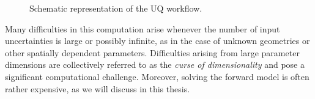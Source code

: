 \begin{figure}
    \centering
    \caption{Schematic representation of the UQ workflow.}
    \label{fig:uq_workflow_tikz}
\end{figure}

Many difficulties in this computation arise whenever the number of input uncertainties is large or possibly infinite, as in the case of unknown geometries or other spatially dependent parameters.
Difficulties arising from large parameter dimensions are collectively referred to as the \emph{curse of dimensionality} and pose a significant computational challenge.
Moreover, solving the forward model is often rather expensive, as we will discuss in this thesis.